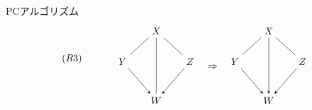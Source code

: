 \documentclass[uplatex, dvipdfmx]{jsarticle}
\begin{document}
\begin{defn}{PCアルゴリズム}
\[
\begin{tikzpicture}[>=stealth, node distance=1.7cm]
  \node (R3) at (-3,0.5) {$(R3)$};
  \node (X1) at (0,1.5) {$X$};
  \node (Y1) at (-1.2,0.4) {$Y$};
  \node (Z1) at (1.2,0.4) {$Z$};
  \node (W1) at (0,-1) {$W$};

  \draw[-] (X1) -- (Y1);
  \draw[-] (X1) -- (Z1);
  \draw[-] (X1) -- (W1);
  \draw[->] (Y1) -- (W1);
  \draw[->] (Z1) -- (W1);

  \node at (2,0.2) {$\Rightarrow$};

  \node (X2) at (4,1.5) {$X$};
  \node (Y2) at (2.8,0.4) {$Y$};
  \node (Z2) at (5.2,0.4) {$Z$};
  \node (W2) at (4,-1) {$W$};

  \draw[-] (X2) -- (Y2);
  \draw[-] (X2) -- (Z2);
  \draw[->] (X2) -- (W2);
  \draw[->] (Y2) -- (W2);
  \draw[->] (Z2) -- (W2);
\end{tikzpicture}
\]
\end{defn}
\end{document}
